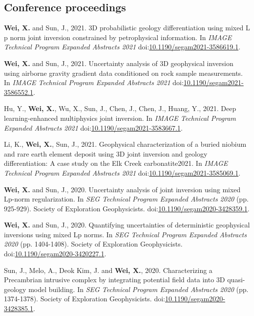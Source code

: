 \documentclass[11pt, a4paper]{article}
\newcommand{\LastName}{Wei}
\newcommand{\Initials}{X}
\newcommand{\Wei}{\textbf{\LastName, \Initials.}}  %
\newcommand{\WeiSun}{\textbf{\LastName, \Initials.} and Sun, J.}  %
\newcommand{\DOI}[1]{doi:\href{https://doi.org/#1}{#1}}
\begin{document}
\subsection*{Conference proceedings}
\begin{etaremune}
	
	\item 
	\WeiSun, 2021. 3D probabilistic geology differentiation using mixed L p norm joint inversion constrained by petrophysical information. In \emph{IMAGE Technical Program Expanded Abstracts 2021} \DOI{10.1190/segam2021-3586619.1}.

	\item 
	\WeiSun, 2021. Uncertainty analysis of 3D geophysical inversion using airborne gravity gradient data conditioned on rock sample measurements. In \emph{IMAGE Technical Program Expanded Abstracts 2021} \DOI{10.1190/segam2021-3586552.1}.
	
	\item 
	Hu, Y., \Wei, Wu, X., Sun, J., Chen, J., Chen, J., Huang, Y., 2021. Deep learning-enhanced multiphysics joint inversion. In \emph{IMAGE Technical Program Expanded Abstracts 2021} \DOI{10.1190/segam2021-3583667.1}.
	
	\item 
	Li, K., \Wei, Sun, J., 2021. Geophysical characterization of a buried niobium and rare earth element deposit using 3D joint inversion and geology differentiation: A case study on the Elk Creek carbonatite2021. In \emph{IMAGE Technical Program Expanded Abstracts 2021} \DOI{10.1190/segam2021-3585069.1}.

	\item 
	\WeiSun, 2020. Uncertainty analysis of joint inversion using mixed Lp-norm regularization. In \emph{SEG Technical Program Expanded Abstracts 2020} (pp. 925-929). Society of Exploration Geophysicists. \DOI{10.1190/segam2020-3428359.1}.

	\item 
	\WeiSun, 2020. Quantifying uncertainties of deterministic geophysical inversions using mixed Lp norms. In \emph{SEG Technical Program Expanded Abstracts 2020} (pp. 1404-1408). Society of Exploration Geophysicists. \DOI{10.1190/segam2020-3420227.1}.
	
	\item 
	Sun, J., Melo, A., Deok Kim, J. and \Wei, 2020. Characterizing a Precambrian intrusive complex by integrating potential field data into 3D quasi-geology model building. In \emph{SEG Technical Program Expanded Abstracts 2020} (pp. 1374-1378). Society of Exploration Geophysicists. \DOI{10.1190/segam2020-3428385.1}.
		
\end{etaremune}
\end{document}
